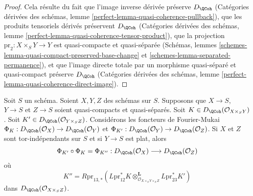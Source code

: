 \begin{proof}
Cela résulte du fait que l'image inverse dérivée préserve
$D_\QCoh$
(Catégories dérivées des schémas, lemme
\ref{perfect-lemma-quasi-coherence-pullback}),
que les produits tensoriels dérivés préservent $D_\QCoh$
(Catégories dérivées des schémas, lemme
\ref{perfect-lemma-quasi-coherence-tensor-product}),
que la projection $\text{pr}_2 : X \times_S Y \to Y$ est
quasi-compacte et quasi-séparée
(Schémas, lemmes
\ref{schemes-lemma-quasi-compact-preserved-base-change} et
\ref{schemes-lemma-separated-permanence}), et
que l'image directe totale par un morphisme quasi-séparé et quasi-compact
préserve $D_\QCoh$
(Catégories dérivées des schémas, lemme
\ref{perfect-lemma-quasi-coherence-direct-image}).
\end{proof}

\begin{lemma}
\label{lemma-compose-fourier-mukai}
Soit $S$ un schéma. Soient $X, Y, Z$ des schémas sur $S$. Supposons que
$X \to S$, $Y \to S$ et $Z \to S$ soient quasi-compacts et quasi-séparés.
Soit $K \in D_\QCoh(\mathcal{O}_{X \times_S Y})$.
Soit $K' \in D_\QCoh(\mathcal{O}_{Y \times_S Z})$.
Considérons les foncteurs de Fourier-Mukai
$\Phi_K : D_\QCoh(\mathcal{O}_X) \to D_\QCoh(\mathcal{O}_Y)$
et $\Phi_{K'} : D_\QCoh(\mathcal{O}_Y) \to D_\QCoh(\mathcal{O}_Z)$.
Si $X$ et $Z$ sont tor-indépendants sur $S$ et si $Y \to S$ est plat,
alors
$$
\Phi_{K'} \circ \Phi_K = \Phi_{K''} :
D_\QCoh(\mathcal{O}_X)
\longrightarrow
D_\QCoh(\mathcal{O}_Z)
$$
où
$$
K'' = R\text{pr}_{13, *}(
L\text{pr}_{12}^*K
\otimes_{\mathcal{O}_{X \times_S Y \times_S Z}}^\mathbf{L}
L\text{pr}_{23}^*K')
$$
dans $D_\QCoh(\mathcal{O}_{X \times_S Z})$.
\end{lemma}

